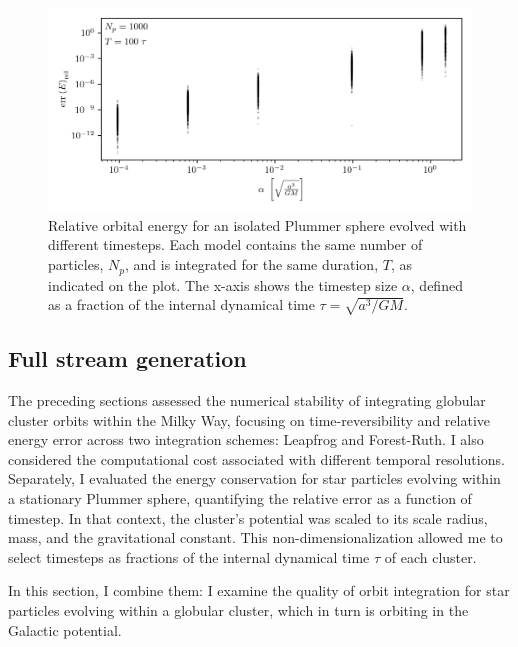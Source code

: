         \begin{figure}
            \centering
            \includegraphics[width=\linewidth]{images/numericalErrorStaticPlummerSphereEnergyError.png}
            \caption[Relative orbital energy for an isolated Plummer sphere]{Relative orbital energy for an isolated Plummer sphere evolved with different timesteps. Each model contains the same number of particles, $N_p$, and is integrated for the same duration, $T$, as indicated on the plot. The x-axis shows the timestep size $\alpha$, defined as a fraction of the internal dynamical time $\tau = \sqrt{a^3 / GM}$.}
            \label{fig:numericalErrorStaticPlummerSphereEnergyError}
        \end{figure}

    \subsection{Full stream generation}
        The preceding sections assessed the numerical stability of integrating globular cluster orbits within the Milky Way, focusing on time-reversibility and relative energy error across two integration schemes: Leapfrog and Forest-Ruth. I also considered the computational cost associated with different temporal resolutions. Separately, I evaluated the energy conservation for star particles evolving within a stationary Plummer sphere, quantifying the relative error as a function of timestep. In that context, the cluster's potential was scaled to its scale radius, mass, and the gravitational constant. This non-dimensionalization allowed me to select timesteps as fractions of the internal dynamical time $\tau$ of each cluster. 

        In this section, I combine them: I examine the quality of orbit integration for star particles evolving within a globular cluster, which in turn is orbiting in the Galactic potential.

